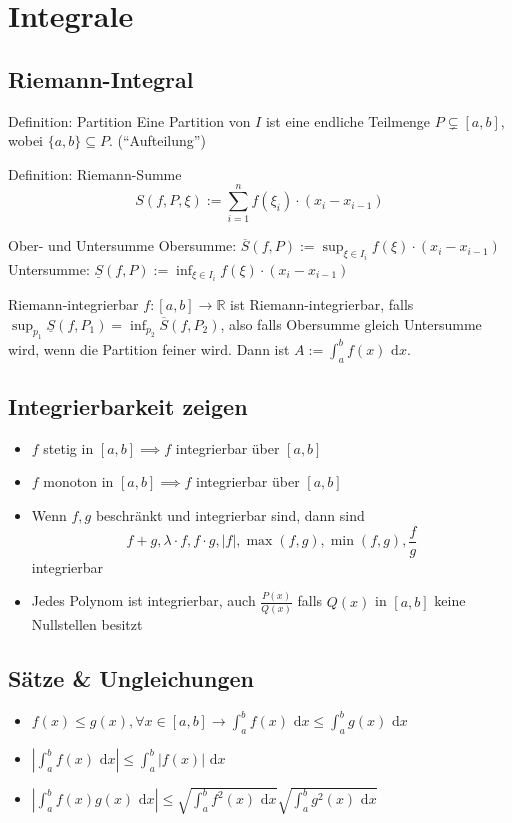 \documentclass[a4paper,10pt]{article}
\def\R{\mathbb{R}}
\def\dx{\text{ d}x}
\begin{document}
\section{Integrale}
\subsection{Riemann-Integral}
\begin{subbox}{Definition: Partition}
 Eine Partition von $I$ ist eine endliche Teilmenge $P \subsetneq [a,b]$, wobei $\{a,b\} \subseteq P$. (``Aufteilung'')
\end{subbox}
\begin{mainbox}{Definition: Riemann-Summe}
 $$S(f, P, \xi) := \sum_{i=1}^n f(\xi_i) \cdot (x_i - x_{i-1})$$
\end{mainbox}
\begin{subbox}{Ober- und Untersumme}
 Obersumme: $\overline{S}(f,P) := \sup_{\xi \in I_i} f(\xi) \cdot (x_i - x_{i-1})$ \\
 Untersumme: $\underline{S}(f,P) := \inf_{\xi \in I_i} f(\xi) \cdot (x_i - x_{i-1})$
\end{subbox}
\begin{mainbox}{Riemann-integrierbar}
 $f:[a,b] \to \R$ ist Riemann-integrierbar, falls $\sup_{p_1} \underline{S}(f,P_1) = \inf_{p_2}\overline{S}(f, P_2)$, also falls Obersumme gleich Untersumme wird, wenn die Partition feiner wird. Dann ist $A := \int_a^b f(x)\dx$.
\end{mainbox}

\subsection{Integrierbarkeit zeigen}
\begin{itemize}
 \item $f$ stetig in $[a,b] \implies f$ integrierbar über $[a,b]$
 \item $f$ monoton in $[a,b] \implies f$ integrierbar über $[a,b]$
 \item Wenn $f,g$ beschränkt und integrierbar sind, dann sind
 $$f+g, \lambda \cdot f, f \cdot g, |f|, \max(f,g), \min(f,g), \frac{f}{g}$$ integrierbar
 \item Jedes Polynom ist integrierbar, auch $\frac{P(x)}{Q(x)}$ falls $Q(x)$ in $[a,b]$ keine Nullstellen besitzt
\end{itemize}

\subsection{Sätze \& Ungleichungen}
\begin{itemize}
 \item $f(x) \le g(x), \forall x \in [a,b] \rightarrow \int_a^b f(x) \dx \le \int_a^b g(x) \dx$
 \item $\left|\int_a^b f(x) \dx\right| \le \int_a^b |f(x)| \dx$
 \item $\left|\int_a^b f(x) g(x) \dx \right| \le \sqrt{\int_a^b f^2(x) \dx} \sqrt{\int_a^b g^2(x) \dx}$
\end{itemize}
\end{document}

